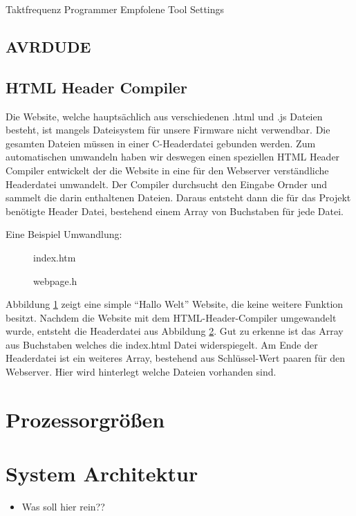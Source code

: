Taktfrequenz
Programmer
Empfolene Tool Settings

\subsection{AVRDUDE}

\subsection{HTML Header Compiler}

Die Website, welche hauptsächlich aus verschiedenen .html und .js Dateien
besteht, ist mangels Dateisystem für unsere Firmware nicht verwendbar. Die
gesamten Dateien müssen in einer C-Headerdatei gebunden werden. Zum
automatischen umwandeln haben wir deswegen einen speziellen HTML Header Compiler
entwickelt der die Website in eine für den Webserver verständliche Headerdatei umwandelt.
Der Compiler durchsucht den Eingabe Ornder und sammelt die darin enthaltenen
Dateien. Daraus entsteht dann die für das Projekt benötigte Header Datei,
bestehend einem Array von Buchstaben für jede Datei.

Eine Beispiel Umwandlung:


\begin{figure}[H]

\caption{index.htm}
\label{input}
\end{figure}

\begin{figure}[H]

\caption{webpage.h}
\label{output}
\end{figure}

Abbildung \ref{input} zeigt eine simple "`Hallo Welt"' Website, die keine
weitere Funktion besitzt. Nachdem die Website mit dem HTML-Header-Compiler
umgewandelt wurde, entsteht die Headerdatei aus Abbildung \ref{output}. Gut zu
erkenne ist das Array aus Buchstaben welches die index.html Datei widerspiegelt.
Am Ende der Headerdatei ist ein weiteres Array, bestehend aus Schlüssel-Wert
paaren für den Webserver. Hier wird hinterlegt welche Dateien vorhanden sind.

\section{Prozessorgrößen}

\section{System Architektur}

\begin{itemize}
\item Was soll hier rein??
\end{itemize}

